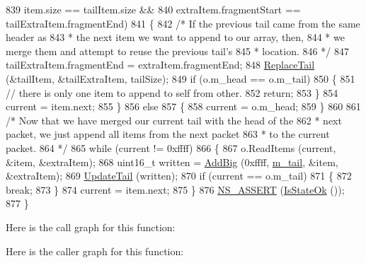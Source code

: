 \begin{DoxyCode}
839       item.size == tailItem.size &&
840       extraItem.fragmentStart == tailExtraItem.fragmentEnd)
841     \{
842       \textcolor{comment}{/* If the previous tail came from the same header as}
843 \textcolor{comment}{       * the next item we want to append to our array, then, }
844 \textcolor{comment}{       * we merge them and attempt to reuse the previous tail's}
845 \textcolor{comment}{       * location.}
846 \textcolor{comment}{       */}
847       tailExtraItem.fragmentEnd = extraItem.fragmentEnd;
848       \hyperlink{classns3_1_1PacketMetadata_a0ad8fd1e4af8eaafca676b4cc3d9749b}{ReplaceTail} (&tailItem, &tailExtraItem, tailSize);
849       \textcolor{keywordflow}{if} (o.m\_head == o.m\_tail)
850         \{
851           \textcolor{comment}{// there is only one item to append to self from other.}
852           \textcolor{keywordflow}{return};
853         \}
854       current = item.next;
855     \}
856   \textcolor{keywordflow}{else}
857     \{
858       current = o.m\_head;
859     \}
860 
861   \textcolor{comment}{/* Now that we have merged our current tail with the head of the}
862 \textcolor{comment}{   * next packet, we just append all items from the next packet}
863 \textcolor{comment}{   * to the current packet.}
864 \textcolor{comment}{   */}
865   \textcolor{keywordflow}{while} (current != 0xffff)
866     \{
867       o.ReadItems (current, &item, &extraItem);
868       uint16\_t written = \hyperlink{classns3_1_1PacketMetadata_ae89a0bf5e3dcd624bd37bc8ca67544da}{AddBig} (0xffff, \hyperlink{classns3_1_1PacketMetadata_ad24a659e236af7b98c475c97c4f60db9}{m\_tail}, &item, &extraItem);
869       \hyperlink{classns3_1_1PacketMetadata_ad975bb9c1c0a6875ccc2309f071c5b55}{UpdateTail} (written);
870       \textcolor{keywordflow}{if} (current == o.m\_tail)
871         \{
872           \textcolor{keywordflow}{break};
873         \}
874       current = item.next;
875     \}
876   \hyperlink{assert_8h_a6dccdb0de9b252f60088ce281c49d052}{NS\_ASSERT} (\hyperlink{classns3_1_1PacketMetadata_a208d3163e28704438cdd4d30318e489c}{IsStateOk} ());
877 \}
\end{DoxyCode}


Here is the call graph for this function\+:




Here is the caller graph for this function\+:


